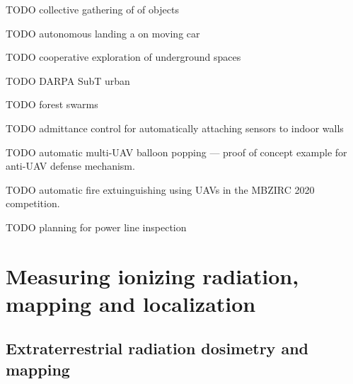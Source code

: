\documentclass[a4paper,11pt,titlepage,twoside]{book}
\newcommand{\todo}[1]{{\color{red} TODO {#1}}}
\begin{document}
\todo{collective gathering of of objects}
\cite{spurny2019cooperative}
\cite{loianno2018localization}

\todo{autonomous landing a on moving car}
\cite{baca2017autonomous}
\cite{baca2019autonomous}

\todo{cooperative exploration of underground spaces}
\cite{roucek2019darpa}


\todo{DARPA SubT urban}
\cite{kratky2020autonomous2} %

\todo{forest swarms}
\cite{dmytruk2020safe}
\cite{ahmad2020autonomous}

\todo{admittance control for automatically attaching sensors to indoor walls}
\cite{smrcka2020admittance}

\todo{automatic multi-UAV balloon popping --- proof of concept example for anti-UAV defense mechanism.}
\cite{stasinchuk2020multiuav}

\todo{automatic fire extuinguishing using UAVs in the MBZIRC 2020 competition.}
\cite{walter2020extinguishing}

\todo{planning for power line inspection}
\cite{silano2020power}



\section{Measuring ionizing radiation, mapping and localization}


\subsection{Extraterrestrial radiation dosimetry and mapping}
\end{document}
